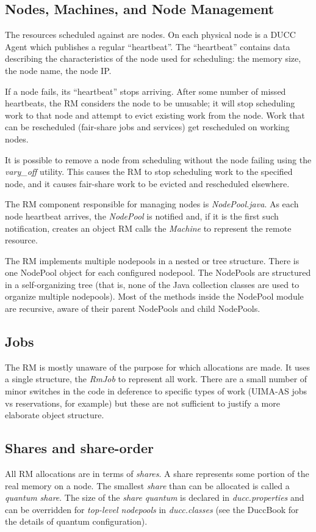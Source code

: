 \subsection{Nodes, Machines,  and Node Management}
    The resources scheduled against are nodes.  On each physical node is a DUCC Agent which
    publishes a regular ``heartbeat''.  The ``heartbeat'' contains data describing the
    characteristics of the node used for scheduling: the memory size, the node name, the 
    node IP.  

    If a node fails, its ``heartbeat'' stops arriving.  After some number of missed
    heartbeats, the RM considers the node to be unusable; it will stop scheduling work
    to that node and attempt to evict existing work from the node.  Work that can
    be rescheduled (fair-share jobs and services) get rescheduled on working nodes.

    It is possible to remove a node from scheduling without the node failing using the
    {\em vary\_off} utility.  This causes the RM to stop scheduling work to the 
    specified node, and it causes fair-share work to be evicted and rescheduled elsewhere.

    The RM component responsible for managing nodes is {\em NodePool.java}.  As each
    node heartbeat arrives, the {\em NodePool} is notified and, if it is the first
    such notification, creates an object RM calls the {\em Machine} to represent the
    remote resource.

    The RM implements multiple nodepools in a nested or tree structure.  There is one NodePool
    object for each configured nodepool.  The NodePools are structured in a self-organizing
    tree (that is, none of the Java collection classes are used to organize multiple nodepools).
    Most of the methods inside the NodePool module are recursive, aware of their parent
    NodePools and child NodePools.

\subsection{Jobs}
    The RM is mostly unaware of the purpose for which allocations are made.  It uses a
    single structure, the {\em RmJob} to represent all work.  There are a small number
    of minor switches in the code in deference to specific types of work (UIMA-AS jobs
    vs reservations, for example) but these are not sufficient to justify a more elaborate
    object structure.

\subsection{Shares and share-order}
    All RM allocations are in terms of {\em shares}. A share represents some portion
    of the real memory on a node.  The smallest {\em share} than can be allocated is
    called a {\em quantum share}.  The size of the {\em share quantum} is declared
    in {\em ducc.properties} and can be overridden for {\em top-level nodepools} in
    {\em ducc.classes} (see the DuccBook for the details of quantum configuration).

